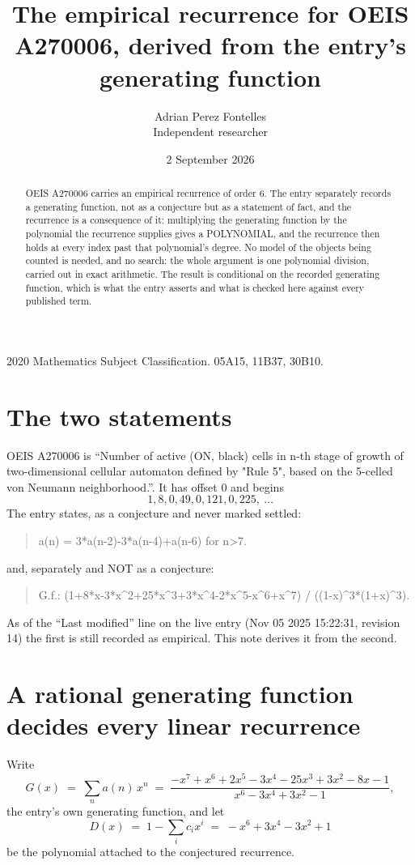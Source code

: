 \documentclass[11pt,a4paper]{article}
\title{The empirical recurrence for OEIS A270006, derived from the entry's generating function}
\author{Adrian Perez Fontelles\\ \small Independent researcher}
\date{2 September 2026}
\theoremstyle{plain}
\theoremstyle{definition}
\begin{document}
\maketitle

\begin{abstract}
OEIS A270006 carries an empirical recurrence of order $6$. The entry separately records a
generating function, not as a conjecture but as a statement of fact, and the recurrence is a
consequence of it: multiplying the generating function by the polynomial the recurrence
supplies gives a POLYNOMIAL, and the recurrence then holds at every index past that
polynomial's degree. No model of the objects being counted is needed, and no search: the
whole argument is one polynomial division, carried out in exact arithmetic. The result is
conditional on the recorded generating function, which is what the entry asserts and what is
checked here against every published term.
\end{abstract}

\noindent\small 2020 Mathematics Subject Classification. 05A15, 11B37, 30B10.\normalsize

\section{The two statements}

OEIS A270006 is ``Number of active (ON, black) cells in n-th stage of growth of two-dimensional cellular automaton defined by "Rule 5", based on the 5-celled von Neumann neighborhood.''. It has offset $0$ and begins
\[
1, 8, 0, 49, 0, 121, 0, 225,\ \dots
\]
The entry states, as a conjecture and never marked settled:
\begin{quote}
a(n) = 3*a(n-2)-3*a(n-4)+a(n-6) for n>7.
\end{quote}
and, separately and NOT as a conjecture:
\begin{quote}
G.f.: (1+8*x-3*x\^{}2+25*x\^{}3+3*x\^{}4-2*x\^{}5-x\^{}6+x\^{}7) / ((1-x)\^{}3*(1+x)\^{}3).
\end{quote}
As of the ``Last modified'' line on the live entry (Nov 05 2025 15:22:31, revision 14) the first is still
recorded as empirical. This note derives it from the second.

\section{A rational generating function decides every linear recurrence}

Write
\[
G(x)\;=\;\sum_{n}a(n)\,x^{n}\;=\;\frac{- x^{7} + x^{6} + 2 x^{5} - 3 x^{4} - 25 x^{3} + 3 x^{2} - 8 x - 1}{x^{6} - 3 x^{4} + 3 x^{2} - 1},
\]
the entry's own generating function, and let
\[
D(x)\;=\;1-\sum_i c_i x^{i}\;=\;- x^{6} + 3 x^{4} - 3 x^{2} + 1
\]
be the polynomial attached to the conjectured recurrence.
\end{document}
